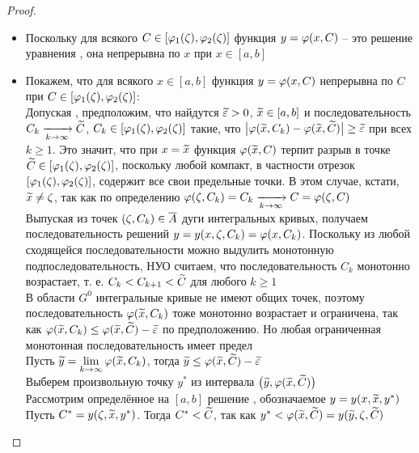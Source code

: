 \begin{proof}
\begin{enumerate}
        \begin{itemize}
        	\item Поскольку для всякого $ C \in [\varphi_1(\zeta), \varphi_2(\zeta)] $ функция $ y = \varphi(x, C) $ -- это решение уравнения , она непрерывна по $ x $ при $ x \in [a, b] $
            \item Покажем, что для всякого $ x \in [a, b] $ функция $ y = \varphi(x, C) $ непрерывна по $ C $ при $ C \in [\varphi_1(\zeta), \varphi_2(\zeta)] $: \\
            Допуская , предположим, что найдутся $ \widetilde{\varepsilon} > 0 $, $ \widetilde{x} \in [a, b] $ и последовательность $ C_k \xrightarrow[{k} \to {\infty}]{} \widetilde{C} $, $ C_k \in [\varphi_1(\zeta), \varphi_2(\zeta)] $ такие, что $ \big| \varphi(\widetilde{x}, C_k) - \varphi(\widetilde{x}, \widetilde{C}) \big| \ge \widetilde{\varepsilon} $ при всех $ k \ge 1 $. Это значит, что при $ x = \widetilde{x} $ функция $ \varphi(\widetilde{x}, C) $ терпит разрыв в точке $ \widetilde{C} \in [\varphi_1(\zeta), \varphi_2(\zeta)] $, поскольку любой компакт, в частности отрезок $ [\varphi_1(\zeta), \varphi_2(\zeta)] $, содержит все свои предельные точки. В этом случае, кстати, $ \widetilde{x} \ne \zeta $, так как по определению $ \varphi(\zeta, C_k) = C_k \xrightarrow[{k} \to {\infty}]{} C = \varphi(\zeta, C) $ \\
            Выпуская из точек $ (\zeta, C_k) \in \overline{A} $ дуги интегральных кривых, получаем последовательность решений $ y = y(x, \zeta, C_k) = \varphi(x, C_k) $. Поскольку из любой сходящейся последовательности можно выдулить монотонную подпоследовательность, НУО считаем, что последовательность $ C_k $ монотонно возрастает, т. е. $ C_k < C_{k + 1} < \widetilde{C} $ для любого $ k \ge 1 $ \\
            В области $ G^0 $ интегральные кривые не имеют общих точек, поэтому последовательность $ \varphi(\widetilde{x}, C_k) $ тоже монотонно возрастает и ограничена, так как $ \varphi(\widetilde{x}, C_k) \le \varphi(\widetilde{x}, \widetilde{C}) - \widetilde{\varepsilon} $ по предположению. Но любая ограниченная монотонная последовательность имеет предел \\
            Пусть $ \widetilde{y} = \lim\limits_{k\to\infty} \varphi(\widetilde{x}, C_k) $, тогда $ \widetilde{y} \le \varphi(\widetilde{x}, \widetilde{C}) - \widetilde{\varepsilon} $ \\
            Выберем произвольную точку $ y^* $ из интервала $ \big( \widetilde{y}, \varphi(\widetilde{x}, \widetilde{C}) \big) $ \\
            Рассмотрим определённое на $ [a, b] $ решение , обозначаемое $ y = y(x, \widetilde{x}, y^*) $ \\
            Пусть $ C^* = y(\zeta, \widetilde{x}, y^*) $. Тогда $ C^* < \widetilde{C} $, так как $ y^* < \varphi(\widetilde{x}, \widetilde{C}) = y(\widetilde{y}, \zeta, \widetilde{C}) $ \\

\end{itemize}
\end{enumerate}
\end{proof}
